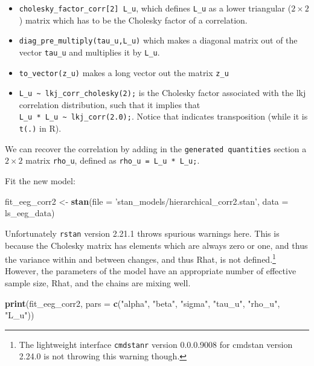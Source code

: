 \documentclass[12pt,]{krantz}
\newenvironment{Shaded}{\begin{snugshade}}{\end{snugshade}}
\newcommand{\DataTypeTok}[1]{\textcolor[rgb]{0.13,0.29,0.53}{#1}}
\newcommand{\KeywordTok}[1]{\textcolor[rgb]{0.13,0.29,0.53}{\textbf{#1}}}
\newcommand{\NormalTok}[1]{#1}
\newcommand{\StringTok}[1]{\textcolor[rgb]{0.31,0.60,0.02}{#1}}
\providecommand{\tightlist}{%
  \setlength{\itemsep}{0pt}\setlength{\parskip}{0pt}}
\theoremstyle{definition}
\theoremstyle{definition}
\theoremstyle{definition}
\theoremstyle{remark}
\begin{document}
\begin{itemize}
\tightlist
\item
  \texttt{cholesky\_factor\_corr{[}2{]}\ L\_u}, which defines \texttt{L\_u} as a lower triangular (\(2 \times 2\))
  matrix which has to be the Cholesky factor of a correlation.
\item
  \texttt{diag\_pre\_multiply(tau\_u,L\_u)} which makes a diagonal matrix out of
  the vector \texttt{tau\_u} and multiplies it by \texttt{L\_u}.
\item
  \texttt{to\_vector(z\_u)} makes a long vector out the matrix \texttt{z\_u}
\item
  \texttt{L\_u\ \textasciitilde{}\ lkj\_corr\_cholesky(2);} is the Cholesky factor associated with the lkj
  correlation distribution, such that it implies that \texttt{L\_u\ *\ L\_u\textquotesingle{}\ \textasciitilde{}\ lkj\_corr(2.0);}. Notice that \texttt{\textquotesingle{}} indicates transposition (while it is \texttt{t(.)} in R).
\end{itemize}

We can recover the correlation by adding in the \texttt{generated\ quantities} section a \(2 \times 2\) matrix \texttt{rho\_u}, defined as \texttt{rho\_u\ =\ L\_u\ *\ L\_u\textquotesingle{};}.

Fit the new model:

\begin{Shaded}
\begin{Highlighting}[]
\NormalTok{fit_eeg_corr2 <-}\StringTok{ }\KeywordTok{stan}\NormalTok{(}\DataTypeTok{file =} \StringTok{'stan_models/hierarchical_corr2.stan'}\NormalTok{, }
                 \DataTypeTok{data =}\NormalTok{ ls_eeg_data)}
\end{Highlighting}
\end{Shaded}

Unfortunately \texttt{rstan} version 2.21.1 throws spurious warnings here. This is because the Cholesky matrix has elements which are always zero or one, and thus the variance within and between changes, and thus Rhat, is not defined.\footnote{The lightweight interface \texttt{cmdstanr} version 0.0.0.9008 for cmdstan version 2.24.0 is not throwing this warning though.} However, the parameters of the model have an appropriate number of effective sample size, Rhat, and the chains are mixing well.

\begin{Shaded}
\begin{Highlighting}[]
\KeywordTok{print}\NormalTok{(fit_eeg_corr2, }\DataTypeTok{pars =}
                       \KeywordTok{c}\NormalTok{(}\StringTok{"alpha"}\NormalTok{, }\StringTok{"beta"}\NormalTok{, }\StringTok{"sigma"}\NormalTok{, }\StringTok{"tau_u"}\NormalTok{, }\StringTok{"rho_u"}\NormalTok{, }\StringTok{"L_u"}\NormalTok{))}
\end{Highlighting}
\end{Shaded}
\end{document}
